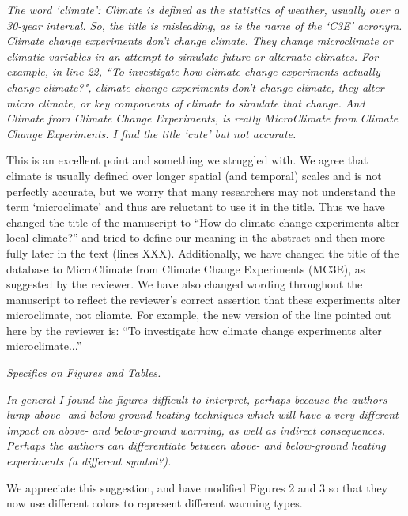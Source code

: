 \documentclass[11pt,a4paper]{letter}
\begin{document}
\begin{letter}{}
\par \emph{The word `climate': Climate is defined as the statistics of weather, usually over a 30-year interval. So, the title is misleading, as is the name of the `C3E' acronym.  Climate change experiments don't change climate.  They change microclimate or climatic variables in an attempt to simulate future or alternate climates.  For example, in line 22, ``To investigate how climate change experiments actually change climate?", climate change experiments don't change climate, they alter micro climate, or key components of climate to simulate that change.  And Climate from Climate Change Experiments, is really MicroClimate from Climate Change Experiments. I find the title `cute' but not accurate.}

\par This is an excellent point and something we struggled with. We agree that climate is usually defined over longer spatial (and temporal) scales and is not perfectly accurate, but we worry that many researchers may not understand the term `microclimate' and thus are reluctant to use it in the title. Thus we have changed the title of the manuscript to ``How do climate change experiments alter local climate?'' and tried to define our meaning in the abstract and then more fully later in the text (lines XXX). Additionally, we have changed the title of the database to MicroClimate from Climate Change Experiments (MC3E), as suggested by the reviewer. We have also changed wording throughout the manuscript to reflect the reviewer's correct assertion that these experiments alter microclimate, not cliamte. For example, the new version of the line pointed out here by the reviewer is: ``To investigate how climate change experiments alter microclimate...''

\par \emph{Specifics on Figures and Tables.}
\par \emph{In general I found the figures difficult to interpret, perhaps because the authors lump above- and below-ground heating techniques which will have a very different impact on above- and below-ground warming, as well as indirect consequences.  Perhaps the authors can differentiate between above- and below-ground heating experiments (a different symbol?).}
\par We appreciate this suggestion, and have modified Figures 2 and 3 so that they now use different colors  to represent different warming types.


\end{letter}
\end{document}
